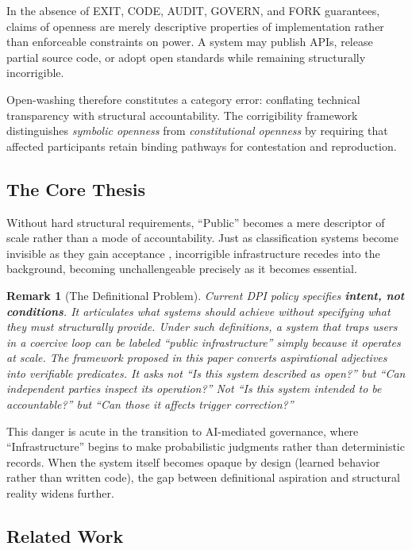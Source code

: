 \documentclass{article}
\newtheorem{remark}{Remark}
\begin{document}
In the absence of EXIT, CODE, AUDIT, GOVERN, and FORK guarantees, claims of openness are merely descriptive properties of implementation rather than enforceable constraints on power. A system may publish APIs, release partial source code, or adopt open standards while remaining structurally incorrigible.

Open-washing therefore constitutes a category error: conflating technical transparency with structural accountability. The corrigibility framework distinguishes \textit{symbolic openness} from \textit{constitutional openness} by requiring that affected participants retain binding pathways for contestation and reproduction.

\subsection{The Core Thesis}

Without hard structural requirements, ``Public'' becomes a mere descriptor of scale rather than a mode of accountability. Just as classification systems become invisible as they gain acceptance \citep{bowker1999}, incorrigible infrastructure recedes into the background, becoming unchallengeable precisely as it becomes essential.

\begin{remark}[The Definitional Problem]
Current DPI policy specifies \textbf{intent, not conditions}. It articulates what systems \textit{should} achieve without specifying what they \textit{must} structurally provide. Under such definitions, a system that traps users in a coercive loop can be labeled ``public infrastructure'' simply because it operates at scale. The framework proposed in this paper converts aspirational adjectives into verifiable predicates. It asks not ``Is this system described as open?'' but ``Can independent parties inspect its operation?'' Not ``Is this system intended to be accountable?'' but ``Can those it affects trigger correction?''
\end{remark}

This danger is acute in the transition to AI-mediated governance, where ``Infrastructure'' begins to make probabilistic judgments rather than deterministic records. When the system itself becomes opaque by design (learned behavior rather than written code), the gap between definitional aspiration and structural reality widens further.

\subsection{Related Work}
\end{document}
